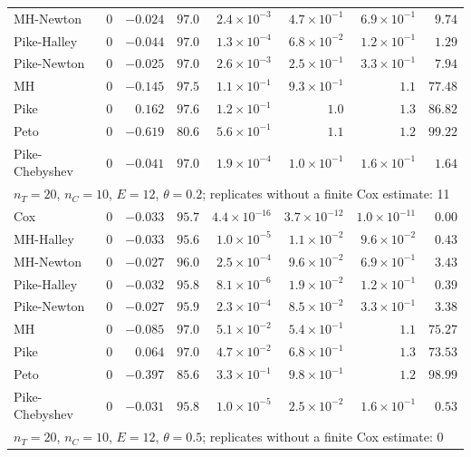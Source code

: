\begin{landscape}
\begin{longtable}{lrrrrrrr}
MH-Newton & 0 & $-0.024$ & $97.0$ & $2.4 \times 10^{-3}$ & $4.7 \times 10^{-1}$ & $6.9 \times 10^{-1}$ & $9.74$ \\
Pike-Halley & 0 & $-0.044$ & $97.0$ & $1.3 \times 10^{-4}$ & $6.8 \times 10^{-2}$ & $1.2 \times 10^{-1}$ & $1.29$ \\
Pike-Newton & 0 & $-0.025$ & $97.0$ & $2.6 \times 10^{-3}$ & $2.5 \times 10^{-1}$ & $3.3 \times 10^{-1}$ & $7.94$ \\
MH & 0 & $-0.145$ & $97.5$ & $1.1 \times 10^{-1}$ & $9.3 \times 10^{-1}$ & $1.1$ & $77.48$ \\
Pike & 0 & $0.162$ & $97.6$ & $1.2 \times 10^{-1}$ & $1.0$ & $1.3$ & $86.82$ \\
Peto & 0 & $-0.619$ & $80.6$ & $5.6 \times 10^{-1}$ & $1.1$ & $1.2$ & $99.22$ \\
Pike-Chebyshev & 0 & $-0.041$ & $97.0$ & $1.9 \times 10^{-4}$ & $1.0 \times 10^{-1}$ & $1.6 \times 10^{-1}$ & $1.64$ \\
\multicolumn{8}{l}{$n_T = 20$, $n_C = 10$, $E = 12$, $\theta = 0.2$; replicates without a finite Cox estimate: 11} \\
Cox & 0 & $-0.033$ & $95.7$ & $4.4 \times 10^{-16}$ & $3.7 \times 10^{-12}$ & $1.0 \times 10^{-11}$ & $0.00$ \\
MH-Halley & 0 & $-0.033$ & $95.6$ & $1.0 \times 10^{-5}$ & $1.1 \times 10^{-2}$ & $9.6 \times 10^{-2}$ & $0.43$ \\
MH-Newton & 0 & $-0.027$ & $96.0$ & $2.5 \times 10^{-4}$ & $9.6 \times 10^{-2}$ & $6.9 \times 10^{-1}$ & $3.43$ \\
Pike-Halley & 0 & $-0.032$ & $95.8$ & $8.1 \times 10^{-6}$ & $1.9 \times 10^{-2}$ & $1.2 \times 10^{-1}$ & $0.39$ \\
Pike-Newton & 0 & $-0.027$ & $95.9$ & $2.3 \times 10^{-4}$ & $8.5 \times 10^{-2}$ & $3.3 \times 10^{-1}$ & $3.38$ \\
MH & 0 & $-0.085$ & $97.0$ & $5.1 \times 10^{-2}$ & $5.4 \times 10^{-1}$ & $1.1$ & $75.27$ \\
Pike & 0 & $0.064$ & $97.0$ & $4.7 \times 10^{-2}$ & $6.8 \times 10^{-1}$ & $1.3$ & $73.53$ \\
Peto & 0 & $-0.397$ & $85.6$ & $3.3 \times 10^{-1}$ & $9.8 \times 10^{-1}$ & $1.2$ & $98.99$ \\
Pike-Chebyshev & 0 & $-0.031$ & $95.8$ & $1.0 \times 10^{-5}$ & $2.5 \times 10^{-2}$ & $1.6 \times 10^{-1}$ & $0.53$ \\
\multicolumn{8}{l}{$n_T = 20$, $n_C = 10$, $E = 12$, $\theta = 0.5$; replicates without a finite Cox estimate: 0} \\

\end{longtable}
\end{landscape}
